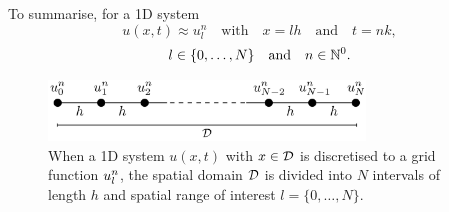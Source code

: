  To summarise, for a 1D system
\begin{equation*}
    u(x,t) \approx u_l^n \quad \text{with} \quad x=lh \quad \text{and} \quad t = nk,
\end{equation*}
\begin{equation*}
    l\in\{0, \hdots, N\}\quad \text{and} \quad n \in \mathbb{N}^0.
\end{equation*}

\begin{figure}[h]
    \centering
    \includegraphics[width=0.75\textwidth]{figures/fdtd/gridExplanation2.pdf}
    \caption{When a 1D system $u(x,t)$ with $x\in \mathcal{D}$ is discretised to a grid function $u_l^n$, the spatial domain $\mathcal{D}$ is divided into $N$ intervals of length $h$ and spatial range of interest $l=\{0, \hdots, N\}$.\label{fig:gridExp}}
\end{figure}

